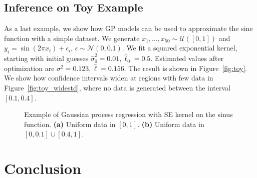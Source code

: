 \documentclass{article}
\begin{document}
\subsection{Inference on Toy Example}

As a last example, we show how GP models can be used to approximate the sine function with a simple dataset. We generate $ x_1, \ldots, x_{50} \sim \mathcal U([0, 1])$ and $y_i = \sin(2\pi x_i) + \epsilon_i$, $\epsilon \sim \mathcal N(0, 0.1)$. We fit a squared exponential kernel, starting with initial guesses $\hat \sigma^2_0 = 0.01, \hat\ell_0 = 0.5$. Estimated values after optimization are $\sigma^2 = 0.123, \hat\ell = 0.156$. The result is shown in Figure~\ref{fig:toy}. 
We show how confidence intervals widen at regions with few data in Figure~\ref{fig:toy_widestd}, where no data is generated between the interval $[0.1, 0.4]$.


\begin{figure}
    \centering
    \caption{Example of Gaussian process regression with SE kernel on the sinus function. \textbf{(a)} Uniform data in $[0, 1]$. \textbf{(b)} Uniform data in $[0, 0.1] \cup [0.4, 1]$.}
    \label{fig:toy_example}
\end{figure}


\section*{Conclusion}
\end{document}
